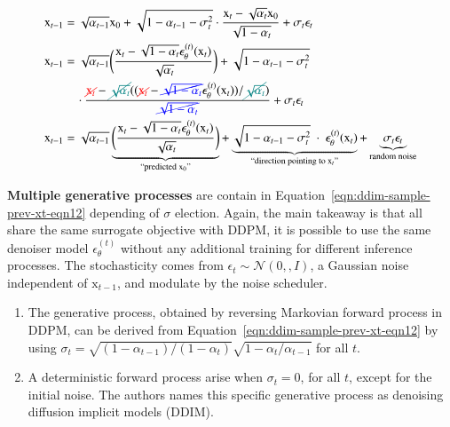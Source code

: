 \begin{equation}\label{eqn:ddim-sample-prev-xt-eqn12}
    \begin{split}
    \mathrm{x}_{t-1} &= \sqrt{\alpha_{t-1}}\mathrm{x}_{0} + \sqrt{1-\alpha_{t-1}-\sigma_{t}^{2}}\cdot\frac{\mathrm{x}_{t} - \sqrt{\alpha_{t}}\mathrm{x}_{0}}{\sqrt{1-\alpha_{t}}} + \sigma_{t}\epsilon_{t} \\ 
    \mathrm{x}_{t-1} &= \sqrt{\alpha_{t-1}}\bigg(\frac{\mathrm{x}_{t} - \sqrt{1 - \alpha_{t}}\epsilon_{\theta}^{(t)}(\mathrm{x}_{t})}{\sqrt{\alpha_{t}}}\bigg) + \sqrt{1 - \alpha_{t-1} - \sigma_{t}^{2}} \\ &~~~~ \cdot\frac{\textcolor{red}{\cancel{\mathrm{x}_{t}}} - \textcolor{teal}{\cancel{\sqrt{\alpha_t}}}((\textcolor{red}{\cancel{\mathrm{x}_{t}}}-\textcolor{blue}{\cancel{\sqrt{1-\alpha_{t}}}}\epsilon_{\theta}^{(t)}(\mathrm{x}_{t})) / \textcolor{teal}{\cancel{\sqrt{\alpha_{t}}}})}{\textcolor{blue}{\cancel{\sqrt{1-\alpha_{t}}}}} + \sigma_{t}\epsilon_{t} \\
    \mathrm{x}_{t-1} &= 
    \sqrt{\alpha_{t-1}}\underbrace{\bigg(\frac{\mathrm{x}_{t}-\sqrt{1-\alpha_{t}}\epsilon_{\theta}^{(t)}(\mathrm{x}_{t})}{\sqrt{\alpha_{t}}}\bigg)}_{\text{``predicted $\mathrm{x}_{0}$''}} 
    + \underbrace{\sqrt{1-\alpha_{t-1} - \sigma^2_{t}}~\cdot~\epsilon_{\theta}^{(t)}(\mathrm{x}_{t})}_{\text{``direction pointing to $\mathrm{x}_{t}$''}}
    + \underbrace{\sigma_{t}\epsilon_{t}}_{\text{random noise}}
    \end{split}
\end{equation}

\noindent \textbf{Multiple generative processes} are contain in Equation~\ref{eqn:ddim-sample-prev-xt-eqn12} depending of $\sigma$ election. Again,
the main takeaway is that all share the same surrogate objective with DDPM, 
it is possible to use the same denoiser model $\epsilon_{\theta}^{(t)}$ without any additional training for different inference processes. The stochasticity comes from $\epsilon_{t}\sim\mathcal{N}(0,, I)$, a Gaussian noise independent of $\mathrm{x}_{t-1}$, and modulate by the noise scheduler. \\

\begin{enumerate}
    \item The generative process, obtained by reversing Markovian forward process in DDPM, can be derived from Equation~\ref{eqn:ddim-sample-prev-xt-eqn12} by using $\sigma_{t} = \sqrt{(1-\alpha_{t-1}) / (1 - \alpha_{t})}\sqrt{1-\alpha_{t}/\alpha_{t-1}}$ for all $t$.
    \item A deterministic forward process arise when $\sigma_{t}=0$, for all $t$, except for the initial noise. The authors names this specific generative process as denoising diffusion implicit models (DDIM).
\end{enumerate}

